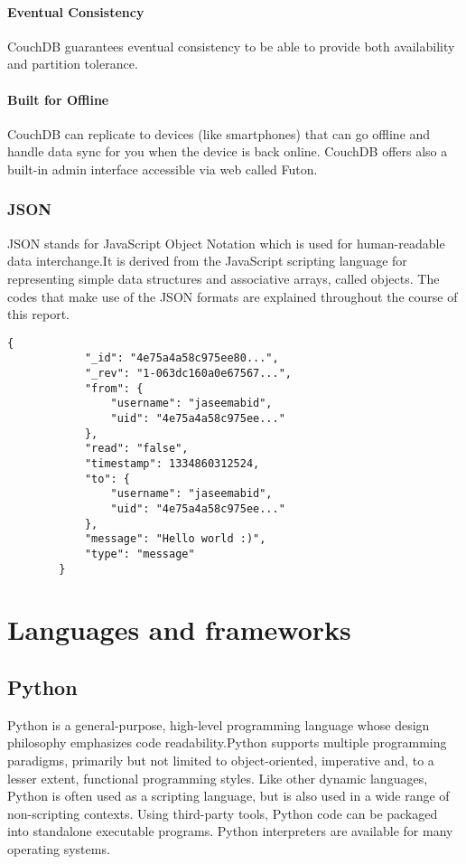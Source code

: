 \documentclass[a4paper,11pt,conference]{IEEEtran}
\begin{document}
			\paragraph{Eventual Consistency}
			CouchDB guarantees eventual consistency to be able to provide both availability and partition tolerance.

			\paragraph{Built for Offline}
			CouchDB can replicate to devices (like smartphones) that can go offline and handle data sync for you when the device is back online. CouchDB offers also a built-in admin interface accessible via web called Futon.

		\subsubsection{JSON}

			JSON stands for JavaScript Object Notation which is used for human-readable data interchange.It is derived from the JavaScript scripting language for representing simple data structures and associative arrays, called objects. The codes that make use of the JSON formats are explained throughout the course of this report.


		\medskip
		\begin{lstlisting}[caption=Example JSON from the application DB]
		{
			"_id": "4e75a4a58c975ee80...",
			"_rev": "1-063dc160a0e67567...",
			"from": {
				"username": "jaseemabid",
				"uid": "4e75a4a58c975ee..."
			},
			"read": "false",
			"timestamp": 1334860312524,
			"to": {
				"username": "jaseemabid",
				"uid": "4e75a4a58c975ee..."
			},
			"message": "Hello world :)",
			"type": "message"
		}
		\end{lstlisting}

	\section{Languages and frameworks}

		\subsection{Python}
		Python is a general-purpose, high-level programming language whose design philosophy emphasizes code readability.Python supports multiple programming paradigms, primarily but not limited to object-oriented, imperative and, to a lesser extent, functional programming styles. Like other dynamic languages, Python is often used as a scripting language, but is also used in a wide range of non-scripting contexts. Using third-party tools, Python code can be packaged into standalone executable programs. Python interpreters are available for many operating systems.
\end{document}
